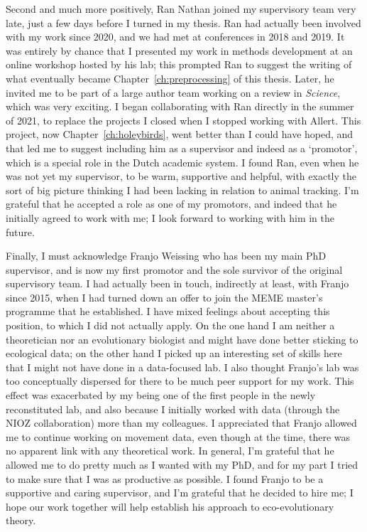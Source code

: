 Second and much more positively, Ran Nathan joined my supervisory team very late, just a few days before I turned in my thesis.
Ran had actually been involved with my work since 2020, and we had met at conferences in 2018 and 2019.
It was entirely by chance that I presented my work in methods development at an online workshop hosted by his lab; this prompted Ran to suggest the writing of what eventually became Chapter~\ref{ch:preprocessing} of this thesis.
Later, he invited me to be part of a large author team working on a review in \textit{Science}, which was very exciting.
I began collaborating with Ran directly in the summer of 2021, to replace the projects I closed when I stopped working with Allert.
This project, now Chapter~\ref{ch:holeybirds}, went better than I could have hoped, and that led me to suggest including him as a supervisor and indeed as a `promotor', which is a special role in the Dutch academic system.
I found Ran, even when he was not yet my supervisor, to be warm, supportive and helpful, with exactly the sort of big picture thinking I had been lacking in relation to animal tracking.
I'm grateful that he accepted a role as one of my promotors, and indeed that he initially agreed to work with me; I look forward to working with him in the future.

Finally, I must acknowledge Franjo Weissing who has been my main PhD supervisor, and is now my first promotor and the sole survivor of the original supervisory team.
I had actually been in touch, indirectly at least, with Franjo since 2015, when I had turned down an offer to join the MEME master's programme that he established.
I have mixed feelings about accepting this position, to which I did not actually apply.
On the one hand I am neither a theoretician nor an evolutionary biologist and might have done better sticking to ecological data; on the other hand I picked up an interesting set of skills here that I might not have done in a data-focused lab.
I also thought Franjo's lab was too conceptually dispersed for there to be much peer support for my work.
This effect was exacerbated by my being one of the first people in the newly reconstituted lab, and also because I initially worked with data (through the NIOZ collaboration) more than my colleagues.
I appreciated that Franjo allowed me to continue working on movement data, even though at the time, there was no apparent link with any theoretical work.
In general, I'm grateful that he allowed me to do pretty much as I wanted with my PhD, and for my part I tried to make sure that I was as productive as possible.
I found Franjo to be a supportive and caring supervisor, and I'm grateful that he decided to hire me; I hope our work together will help establish his approach to eco-evolutionary theory.


